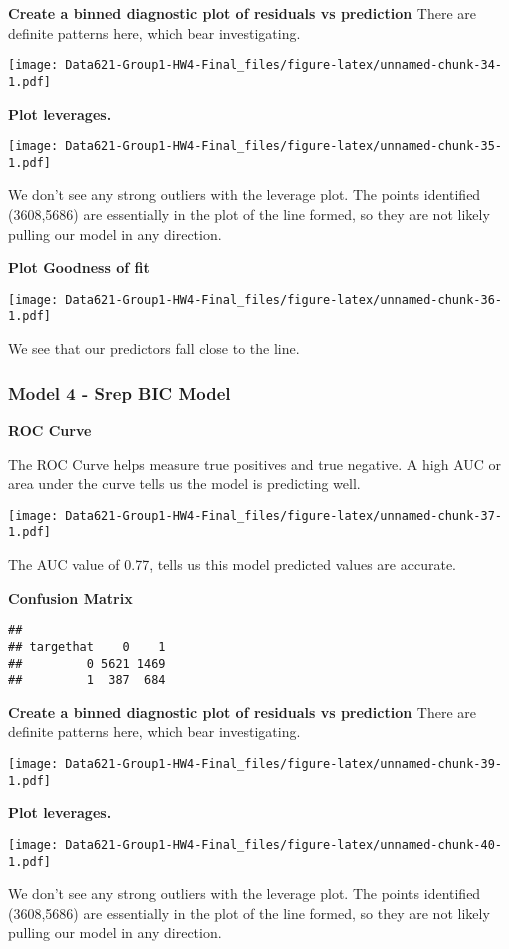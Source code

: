 \documentclass[]{article}
\begin{document}
\textbf{Create a binned diagnostic plot of residuals vs prediction}
There are definite patterns here, which bear investigating.

\texttt{[image: Data621-Group1-HW4-Final\_files/figure-latex/unnamed-chunk-34-1.pdf]}

\textbf{Plot leverages.}

\texttt{[image: Data621-Group1-HW4-Final\_files/figure-latex/unnamed-chunk-35-1.pdf]}

We don't see any strong outliers with the leverage plot. The points
identified (3608,5686) are essentially in the plot of the line formed,
so they are not likely pulling our model in any direction.

\textbf{Plot Goodness of fit}

\texttt{[image: Data621-Group1-HW4-Final\_files/figure-latex/unnamed-chunk-36-1.pdf]}

We see that our predictors fall close to the line.

\hypertarget{model-4---srep-bic-model}{%
\subsubsection{Model 4 - Srep BIC
Model}\label{model-4---srep-bic-model}}

\textbf{ROC Curve}

The ROC Curve helps measure true positives and true negative. A high AUC
or area under the curve tells us the model is predicting well.

\texttt{[image: Data621-Group1-HW4-Final\_files/figure-latex/unnamed-chunk-37-1.pdf]}

The AUC value of 0.77, tells us this model predicted values are
accurate.

\textbf{Confusion Matrix}

\begin{verbatim}
##          
## targethat    0    1
##         0 5621 1469
##         1  387  684
\end{verbatim}

\textbf{Create a binned diagnostic plot of residuals vs prediction}
There are definite patterns here, which bear investigating.

\texttt{[image: Data621-Group1-HW4-Final\_files/figure-latex/unnamed-chunk-39-1.pdf]}

\textbf{Plot leverages.}

\texttt{[image: Data621-Group1-HW4-Final\_files/figure-latex/unnamed-chunk-40-1.pdf]}

We don't see any strong outliers with the leverage plot. The points
identified (3608,5686) are essentially in the plot of the line formed,
so they are not likely pulling our model in any direction.
\end{document}
